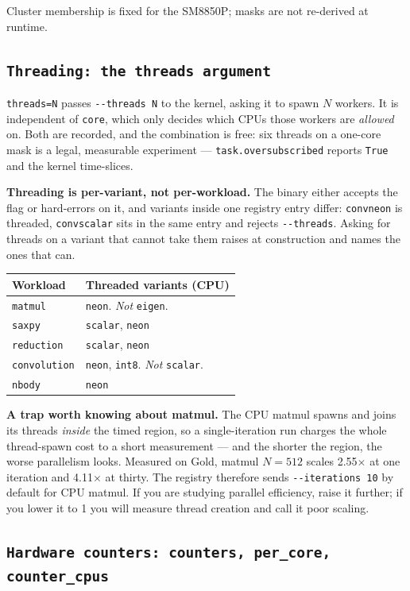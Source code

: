 \documentclass[11pt,a4paper]{article}
\newcommand{\code}[1]{\texttt{\let\_\breakableunderscore #1}}
\newcommand{\breakableunderscore}{\textunderscore\allowbreak}
\newcommand{\apient}[1]{\subsection{\texttt{#1}}}
\begin{document}
\noindent Cluster membership is fixed for the SM8850P; masks are not
re-derived at runtime.

\apient{Threading: the \texttt{threads} argument}
\label{sec:threads}

\code{threads=N} passes \code{-{}-threads N} to the kernel, asking it to spawn
$N$ workers. It is independent of \code{core}, which only decides which CPUs
those workers are \emph{allowed} on. Both are recorded, and the combination is
free: six threads on a one-core mask is a legal, measurable experiment ---
\code{task.oversubscribed} reports \code{True} and the kernel time-slices.

\textbf{Threading is per-variant, not per-workload.} The binary either accepts
the flag or hard-errors on it, and variants inside one registry entry differ:
\code{conv\_neon} is threaded, \code{conv\_scalar} sits in the same entry and
rejects \code{-{}-threads}. Asking for threads on a variant that cannot take
them raises at construction and names the ones that can.

\begin{longtable}{@{}p{3.2cm}p{11.6cm}@{}}
\toprule
\textbf{Workload} & \textbf{Threaded variants (CPU)} \\
\midrule
\endhead
\code{matmul} & \code{neon}. \emph{Not} \code{eigen}. \\
\code{saxpy} & \code{scalar}, \code{neon} \\
\code{reduction} & \code{scalar}, \code{neon} \\
\code{convolution} & \code{neon}, \code{int8}. \emph{Not} \code{scalar}. \\
\code{nbody} & \code{neon} \\
\bottomrule
\end{longtable}

\noindent \textbf{A trap worth knowing about matmul.} The CPU matmul spawns and
joins its threads \emph{inside} the timed region, so a single-iteration run
charges the whole thread-spawn cost to a short measurement --- and the shorter
the region, the worse parallelism looks. Measured on Gold, matmul $N=512$
scales 2.55$\times$ at one iteration and 4.11$\times$ at thirty. The registry
therefore sends \code{-{}-iterations 10} by default for CPU matmul. If you are
studying parallel efficiency, raise it further; if you lower it to 1 you will
measure thread creation and call it poor scaling.

\apient{Hardware counters: \texttt{counters}, \texttt{per\_core}, \texttt{counter\_cpus}}
\label{sec:counters}
\end{document}
